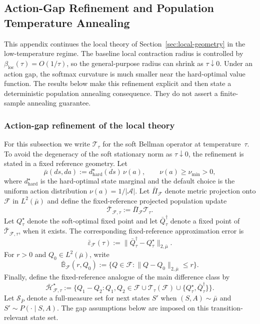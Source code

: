 \documentclass{article}
\newcommand{\hard}{\mathrm{hard}}
\newcommand{\loc}{\mathrm{loc}}
\theoremstyle{plain}
\theoremstyle{definition}
\theoremstyle{remark}
\begin{document}
\subsection{Action-Gap Refinement and Population Temperature Annealing}
\label{app:homotopy}

This appendix continues the local theory of Section~\ref{sec:local-geometry}
in the low-temperature regime.  The baseline local contraction radius is
controlled by $\beta_{\loc}(\tau)=O(1/\tau)$, so the general-purpose radius can
shrink as $\tau\downarrow0$.  Under an action gap, the softmax curvature is much
smaller near the hard-optimal value function.  The results below make this
refinement explicit and then state a deterministic population annealing
consequence.  They do not assert a finite-sample annealing guarantee.

\subsubsection{Action-gap refinement of the local theory}
\label{app:tausmall}

For this subsection we write $\mathcal T_\tau$ for the soft Bellman operator at
temperature~$\tau$.  To avoid the degeneracy of the soft stationary norm as
$\tau\downarrow0$, the refinement is stated in a fixed reference geometry. Let
\[
\bar\mu(ds,da)
:=
d^\star_{\hard}(ds)\,\nu(a),
\qquad
\nu(a)\ge\nu_{\min}>0,
\]
where $d^\star_{\hard}$ is the hard-optimal state marginal and the default
choice is the uniform action distribution $\nu(a)=1/|\mathcal A|$.  Let
$\bar\Pi_{\mathcal F}$ denote metric projection onto $\mathcal F$ in
$L^2(\bar\mu)$ and define the fixed-reference projected population update
\[
\bar{\mathcal T}_{\mathcal F,\tau}
:=
\bar\Pi_{\mathcal F}\mathcal T_\tau.
\]
Let $Q^\star_\tau$ denote the soft-optimal fixed point and let
$\bar Q^\dagger_\tau$ denote a fixed point of
$\bar{\mathcal T}_{\mathcal F,\tau}$, when it exists.  The corresponding
fixed-reference approximation error is
\[
\bar\varepsilon_{\mathcal F}(\tau)
:=
\|\bar Q^\dagger_\tau-Q^\star_\tau\|_{2,\bar\mu}.
\]
For \(r>0\) and \(Q_0\in L^2(\bar\mu)\), write
\[
\bar{\mathbb B}_{\mathcal F}(r,Q_0)
:=
\{Q\in\mathcal F:\|Q-Q_0\|_{2,\bar\mu}\le r\}.
\]
Finally, define the fixed-reference analogue of the main difference class by
\[
\bar{\mathcal H}_{\mathcal F,\tau}^\star
:=
\{Q_1-Q_2:
Q_1,Q_2\in
\mathcal F\cup\mathcal T_\tau(\mathcal F)
\cup\{Q^\star_\tau,\bar Q^\dagger_\tau\}\}.
\]
Let $\mathcal S_{\bar P}$ denote a full-measure set for next states $S'$ when
$(S,A)\sim\bar\mu$ and $S'\sim P(\cdot\mid S,A)$. The gap assumptions below are
imposed on this transition-relevant state set.
\end{document}
